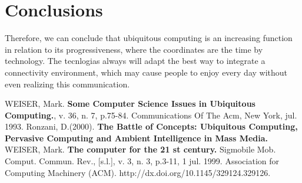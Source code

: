 \documentclass[a4paper,times,12pt]{article}
\begin{document}
\section{Conclusions}
Therefore, we can conclude that ubiquitous computing is an increasing function in relation to its progressiveness, where the coordinates are the time by technology. The tecnlogias always will adapt the best way to integrate a connectivity environment, which may cause people to enjoy every day without even realizing this communication.
\begin{thebibliography}{00}
 WEISER, Mark. \textbf{Some Computer Science Issues in Ubiquitous Computing.}, v. 36, n. 7, p.75-84. Communications Of The Acm, New York, jul. 1993. 
Ronzani, D.(2000). \textbf{The Battle of Concepts: Ubiquitous Computing, Pervasive Computing and Ambient Intelligence in Mass Media.}
 WEISER, Mark. \textbf{The computer for the 21 st century.} Sigmobile Mob. Comput. Commun. Rev., [s.l.], v. 3, n. 3, p.3-11, 1 jul. 1999. Association for Computing Machinery (ACM). http://dx.doi.org/10.1145/329124.329126.
\end{thebibliography}

\end{document}

